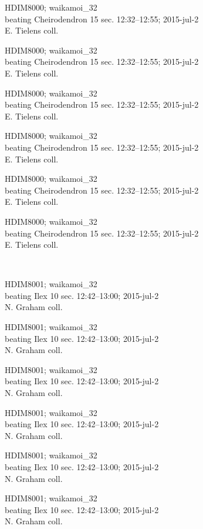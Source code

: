 \documentclass[2pt]{extarticle}
\begin{document}
\noindent
\parbox{0.16\textwidth}{\tiny \raggedright \rule[-0.3\baselineskip]{0pt}{10pt}HDIM8000; waikamoi\_32\\ beating Cheirodendron 15 sec. 12:32--12:55; 2015-jul-2\\ E. Tielens coll.}
\parbox{0.16\textwidth}{\tiny \raggedright \rule[-0.3\baselineskip]{0pt}{10pt}HDIM8000; waikamoi\_32\\ beating Cheirodendron 15 sec. 12:32--12:55; 2015-jul-2\\ E. Tielens coll.}
\parbox{0.16\textwidth}{\tiny \raggedright \rule[-0.3\baselineskip]{0pt}{10pt}HDIM8000; waikamoi\_32\\ beating Cheirodendron 15 sec. 12:32--12:55; 2015-jul-2\\ E. Tielens coll.}
\parbox{0.16\textwidth}{\tiny \raggedright \rule[-0.3\baselineskip]{0pt}{10pt}HDIM8000; waikamoi\_32\\ beating Cheirodendron 15 sec. 12:32--12:55; 2015-jul-2\\ E. Tielens coll.}
\parbox{0.16\textwidth}{\tiny \raggedright \rule[-0.3\baselineskip]{0pt}{10pt}HDIM8000; waikamoi\_32\\ beating Cheirodendron 15 sec. 12:32--12:55; 2015-jul-2\\ E. Tielens coll.}
\parbox{0.16\textwidth}{\tiny \raggedright \rule[-0.3\baselineskip]{0pt}{10pt}HDIM8000; waikamoi\_32\\ beating Cheirodendron 15 sec. 12:32--12:55; 2015-jul-2\\ E. Tielens coll.} \\ 
\vspace{0.001in} 

\noindent
\parbox{0.16\textwidth}{\tiny \raggedright \rule[-0.3\baselineskip]{0pt}{10pt}HDIM8001; waikamoi\_32\\ beating Ilex 10 sec. 12:42--13:00; 2015-jul-2\\ N. Graham coll.}
\parbox{0.16\textwidth}{\tiny \raggedright \rule[-0.3\baselineskip]{0pt}{10pt}HDIM8001; waikamoi\_32\\ beating Ilex 10 sec. 12:42--13:00; 2015-jul-2\\ N. Graham coll.}
\parbox{0.16\textwidth}{\tiny \raggedright \rule[-0.3\baselineskip]{0pt}{10pt}HDIM8001; waikamoi\_32\\ beating Ilex 10 sec. 12:42--13:00; 2015-jul-2\\ N. Graham coll.}
\parbox{0.16\textwidth}{\tiny \raggedright \rule[-0.3\baselineskip]{0pt}{10pt}HDIM8001; waikamoi\_32\\ beating Ilex 10 sec. 12:42--13:00; 2015-jul-2\\ N. Graham coll.}
\parbox{0.16\textwidth}{\tiny \raggedright \rule[-0.3\baselineskip]{0pt}{10pt}HDIM8001; waikamoi\_32\\ beating Ilex 10 sec. 12:42--13:00; 2015-jul-2\\ N. Graham coll.}
\parbox{0.16\textwidth}{\tiny \raggedright \rule[-0.3\baselineskip]{0pt}{10pt}HDIM8001; waikamoi\_32\\ beating Ilex 10 sec. 12:42--13:00; 2015-jul-2\\ N. Graham coll.} \\ 
\vspace{0.001in} 
\end{document}
